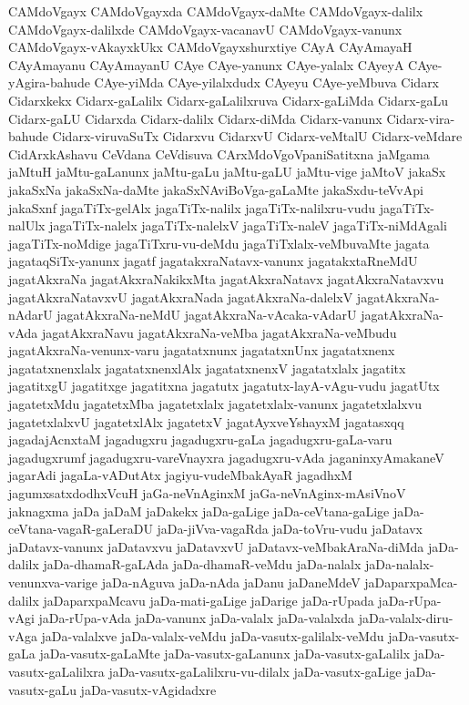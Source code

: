 {CAMdoVgayx
CAMdoVgayxda
CAMdoVgayx-daMte
CAMdoVgayx-dalilx
CAMdoVgayx-dalilxde
CAMdoVgayx-vacanavU
CAMdoVgayx-vanunx
CAMdoVgayx-vAkayxkUkx
CAMdoVgayxshurxtiye
CAyA
CAyAmayaH
CAyAmayanu
CAyAmayanU
CAye
CAye-yanunx
CAye-yalalx
CAyeyA
CAye-yAgira-bahude
CAye-yiMda
CAye-yilalxdudx
CAyeyu
CAye-yeMbuva
Cidarx
Cidarxkekx
Cidarx-gaLalilx
Cidarx-gaLalilxruva
Cidarx-gaLiMda
Cidarx-gaLu
Cidarx-gaLU
Cidarxda
Cidarx-dalilx
Cidarx-diMda
Cidarx-vanunx
Cidarx-vira-bahude
Cidarx-viruvaSuTx
Cidarxvu
CidarxvU
Cidarx-veMtalU
Cidarx-veMdare
CidArxkAshavu
CeVdana
CeVdisuva
CArxMdoVgoVpaniSatitxna
jaMgama
jaMtuH
jaMtu-gaLanunx
jaMtu-gaLu
jaMtu-gaLU
jaMtu-vige
jaMtoV
jakaSx
jakaSxNa
jakaSxNa-daMte
jakaSxNAviBoVga-gaLaMte
jakaSxdu-teVvApi
jakaSxnf
jagaTiTx-gelAlx
jagaTiTx-nalilx
jagaTiTx-nalilxru-vudu
jagaTiTx-nalUlx
jagaTiTx-nalelx
jagaTiTx-nalelxV
jagaTiTx-naleV
jagaTiTx-niMdAgali
jagaTiTx-noMdige
jagaTiTxru-vu-deMdu
jagaTiTxlalx-veMbuvaMte
jagata
jagataqSiTx-yanunx
jagatf
jagatakxraNatavx-vanunx
jagatakxtaRneMdU
jagatAkxraNa
jagatAkxraNakikxMta
jagatAkxraNatavx
jagatAkxraNatavxvu
jagatAkxraNatavxvU
jagatAkxraNada
jagatAkxraNa-dalelxV
jagatAkxraNa-nAdarU
jagatAkxraNa-neMdU
jagatAkxraNa-vAcaka-vAdarU
jagatAkxraNa-vAda
jagatAkxraNavu
jagatAkxraNa-veMba
jagatAkxraNa-veMbudu
jagatAkxraNa-venunx-varu
jagatatxnunx
jagatatxnUnx
jagatatxnenx
jagatatxnenxlalx
jagatatxnenxlAlx
jagatatxnenxV
jagatatxlalx
jagatitx
jagatitxgU
jagatitxge
jagatitxna
jagatutx
jagatutx-layA-vAgu-vudu
jagatUtx
jagatetxMdu
jagatetxMba
jagatetxlalx
jagatetxlalx-vanunx
jagatetxlalxvu
jagatetxlalxvU
jagatetxlAlx
jagatetxV
jagatAyxveYshayxM
jagatasxqq
jagadajAcnxtaM
jagadugxru
jagadugxru-gaLa
jagadugxru-gaLa-varu
jagadugxrumf
jagadugxru-vareVnayxra
jagadugxru-vAda
jaganinxyAmakaneV
jagarAdi
jagaLa-vADutAtx
jagiyu-vudeMbakAyaR
jagadhxM
jagumxsatxdodhxVcuH
jaGa-neVnAginxM
jaGa-neVnAginx-mAsiVnoV
jaknagxma
jaDa
jaDaM
jaDakekx
jaDa-gaLige
jaDa-ceVtana-gaLige
jaDa-ceVtana-vagaR-gaLeraDU
jaDa-jiVva-vagaRda
jaDa-toVru-vudu
jaDatavx
jaDatavx-vanunx
jaDatavxvu
jaDatavxvU
jaDatavx-veMbakAraNa-diMda
jaDa-dalilx
jaDa-dhamaR-gaLAda
jaDa-dhamaR-veMdu
jaDa-nalalx
jaDa-nalalx-venunxva-varige
jaDa-nAguva
jaDa-nAda
jaDanu
jaDaneMdeV
jaDaparxpaMca-dalilx
jaDaparxpaMcavu
jaDa-mati-gaLige
jaDarige
jaDa-rUpada
jaDa-rUpa-vAgi
jaDa-rUpa-vAda
jaDa-vanunx
jaDa-valalx
jaDa-valalxda
jaDa-valalx-diru-vAga
jaDa-valalxve
jaDa-valalx-veMdu
jaDa-vasutx-galilalx-veMdu
jaDa-vasutx-gaLa
jaDa-vasutx-gaLaMte
jaDa-vasutx-gaLanunx
jaDa-vasutx-gaLalilx
jaDa-vasutx-gaLalilxra
jaDa-vasutx-gaLalilxru-vu-dilalx
jaDa-vasutx-gaLige
jaDa-vasutx-gaLu
jaDa-vasutx-vAgidadxre
}
